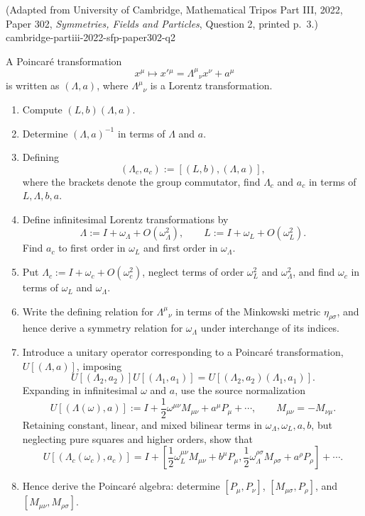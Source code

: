 \begin{enumerate}
  {(Adapted from University of Cambridge, Mathematical Tripos Part III, 2022, Paper 302, \emph{Symmetries, Fields and Particles}, Question 2, printed p.~3.)}
  {cambridge-partiii-2022-sfp-paper302-q2}

A Poincar\'e transformation
\[
 x^\mu\longmapsto x'{}^\mu=\Lambda^\mu{}_{\nu}x^\nu+a^\mu
\]
is written as \((\Lambda,a)\), where \(\Lambda^\mu{}_{\nu}\) is a
Lorentz transformation.
\begin{enumerate}
\item[(i)] Compute \((L,b)(\Lambda,a)\).
\item[(ii)] Determine \((\Lambda,a)^{-1}\) in terms of \(\Lambda\) and
\(a\).
\item[(iii)] Defining
\[
 (\Lambda_c,a_c):=[(L,b),(\Lambda,a)],
\]
where the brackets denote the group commutator, find \(\Lambda_c\) and
\(a_c\) in terms of \(L,\Lambda,b,a\).
\item[(iv)] Define infinitesimal Lorentz transformations by
\[
 \Lambda:=I+\omega_\Lambda+O(\omega_\Lambda^2),\qquad
 L:=I+\omega_L+O(\omega_L^2).
\]
Find \(a_c\) to first order in \(\omega_L\) and first order in
\(\omega_\Lambda\).
\item[(v)] Put \(\Lambda_c:=I+\omega_c+O(\omega_c^2)\), neglect terms
of order \(\omega_L^2\) and \(\omega_\Lambda^2\), and find \(\omega_c\)
in terms of \(\omega_L\) and \(\omega_\Lambda\).
\item[(vi)] Write the defining relation for \(\Lambda^\mu{}_{\nu}\) in
terms of the Minkowski metric \(\eta_{\rho\sigma}\), and hence derive a
symmetry relation for \(\omega_\Lambda\) under interchange of its
indices.
\item[(vii)] Introduce a unitary operator corresponding to a Poincar\'e
transformation, \(U[(\Lambda,a)]\), imposing
\[
 U[(\Lambda_2,a_2)]U[(\Lambda_1,a_1)]
 =U[(\Lambda_2,a_2)(\Lambda_1,a_1)].
\]
Expanding in infinitesimal \(\omega\) and \(a\), use the source
normalization
\[
 U[(\Lambda(\omega),a)]
 :=I+\frac12\omega^{\mu\nu}M_{\mu\nu}+a^\mu P_\mu+\cdots,
 \qquad M_{\mu\nu}=-M_{\nu\mu}.
\]
Retaining constant, linear, and mixed bilinear terms in
\(\omega_\Lambda,\omega_L,a,b\), but neglecting pure squares and higher
orders, show that
\[
 U[(\Lambda_c(\omega_c),a_c)]
 =I+\left[
 \frac12\omega_L^{\mu\nu}M_{\mu\nu}+b^\mu P_\mu,
 \frac12\omega_\Lambda^{\rho\sigma}M_{\rho\sigma}+a^\rho P_\rho
 \right]+\cdots.
\]
\item[(viii)] Hence derive the Poincar\'e algebra: determine
\([P_\mu,P_\nu]\), \([M_{\mu\sigma},P_\rho]\), and
\([M_{\mu\nu},M_{\rho\sigma}]\).
\end{enumerate}


\end{enumerate}
